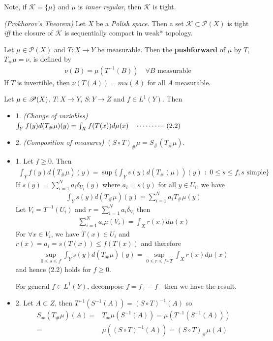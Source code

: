\documentclass[12pt,a4paper]{article}
\newenvironment{proof}
{\begin{changemargin}{1cm}{0.5cm} 
	}%
	{\end{changemargin}
}
\renewenvironment{i}
{\begin{itemize} 
	}%
	{\end{itemize}
}
\newenvironment{p}
{\begin{proof} 
	}%
	{\end{proof}
}
\begin{document}
\quad Note, if $\mathscr{K} = \{\mu\}$ and $\mu$ is \emph{inner regular}, then $\mathscr{K}$ is tight. 
\s

 \emph{(Prokhorov's Theorem)} Let $X$ be a \emph{Polish space}. Then a set $\mathscr{K} \subset \mathscr{P}(X)$ is tight \textit{iff} the closure of $\mathscr{K}$ is sequentially compact in weak* topology.
\s

 Let $\mu\in \mathscr{P}(X)$ and $T: X\rightarrow Y$ be measurable. Then the \textbf{pushforward} of $\mu$ by $T$, $T_{\#} \mu = \nu$, is defined by
\begin{align*}
\nu(B) = \mu(T^{-1}(B)) \quad \forall B \text{ measurable}
\end{align*}
If $T$ is invertible, then $\nu(T(A))= mu(A)$ for all $A$ measurable.
\s

 Let $\mu \in \mathscr{P}(X)$, $T: X\rightarrow Y$, $S:Y\rightarrow Z$ and $f\in L^1(Y)$. Then
\begin{i}
\item[1.] \emph{(Change of variables)} $\int_Y f(y)d(T_{\#} \mu) (y) = \int_X f(T(x))d\mu(x) \quad \cdots\cdots\cdots\,\,(2.2)$
\item[2.] \emph{(Composition of measures)} $(S\circ T)_{\#}\mu = S_{\#}(T_{\#}\mu)$. 
\end{i}
\begin{p}
\pf \begin{i}
\item[1.] Let $f\geq 0$. Then
\begin{align*}
\int_Y f(y) d(T_{\#}\mu)(y) = \sup \Big\{ \int_Y s(y) d(T_{\#}(\mu))(y)\,\, : \,\, 0\leq s \leq f, s\text{ simple} \Big\}
\end{align*}
If $s(y) = \sum_{i=1}^N a_i \delta_{U_i}(y)$ where $a_i = s(y)$ for all $y\in U_i$, we have
\begin{align*}
\int_Y s(y) d(T_{\#}\mu)(y) = \sum_{i=1}^N a_i T_{\#} \mu (y)
\end{align*}
Let $V_i = T^{-1}(U_i)$ and $r= \sum_{i=1}^N a_i \delta_{V_i}$ then 
\begin{align*}
\sum_{i=1}^N a_i \mu(V_i) = \int_X r(x)d\mu(x)
\end{align*}
For $\forall x\in V_i$, we have $T(x) \in U_i$ and $r(x) = a_i = s(T(x)) \leq f(T(x))$ and therefore
\begin{align*}
\sup_{0\leq s \leq f}\int_Y s(y) d(T_{\#}\mu)(y) = \sup_{0\leq r \leq f\circ T} \int_X r(x) d\mu(x) 
\end{align*}
and hence (2.2) holds for $f\geq 0$.

\quad For general $f \in L^1(Y)$, decompose $f=f_+ - f_-$ then we have the result.
\item[2.] Let $A\subset Z$, then $T^{-1}(S^{-1}(A)) = (S\circ T)^{-1}(A)$ so
\begin{align*}
S_{\#}(T_{\#}\mu) (A) =& T_{\#}\mu(S^{-1}(A)) = \mu(T^{-1}(S^{-1}(A))) \\
=& \mu((S\circ T)^{-1} (A)) = (S\circ T)_{\#} \mu(A)
\end{align*}
\end{i}
\eop
\end{p}
\s
\end{document}
